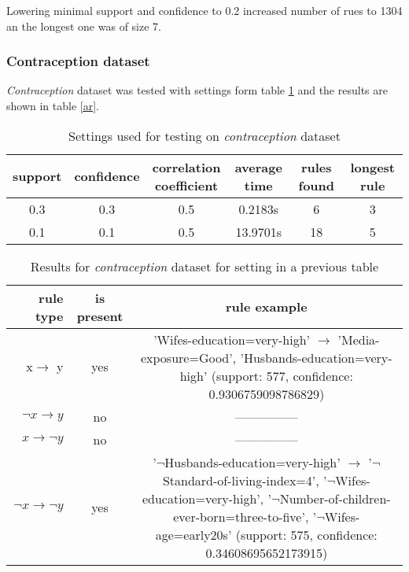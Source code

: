 \documentclass{article}
\begin{document}
	Lowering minimal support and confidence to 0.2 increased number of rues to 1304 an the longest one was of size 7.
 	
 	\subsubsection{Contraception dataset}
 	\textit{Contraception} dataset was tested with settings form table \ref{cs} and the results are shown in table \ref{ar}.
 	
 	\begin{table}[H]
 		\centering
 		\label{cs}
 		\begin{tabular}{c |c |c|c|c|c}
 			support&confidence&\makecell{correlation\\coefficient}&average time&rules found&longest rule\\
 			\hline
 			\hline
 			0.3&0.3&0.5&0.2183s&6&3\\
 			\hline
 			0.1&0.1&0.5&13.9701s&18&5\\
 		\end{tabular}
 		\caption{Settings used for testing on \textit{contraception} dataset}
 	\end{table}
 	\begin{table}[H]
 		\centering
 		\label{cr}
 		\begin{tabular}{r|c |c}
 			rule type& is present & rule example\\
 			\hline
 			\hline
 			x$\rightarrow$ y & yes & \makecell{'Wifes-education=very-high' $\rightarrow$\\'Media-exposure=Good', 'Husbands-education=very-high'\\ (support: 577, confidence: 0.9306759098786829)}\\
 			\hline
 			$\neg x\rightarrow y$ & no &---------------\\
 			\hline
 			$x\rightarrow \neg y $& no &---------------\\
 			\hline
 			$\neg x\rightarrow \neg y $& yes & \makecell{'$\neg$Husbands-education=very-high' $\rightarrow$\\ '$\neg$Standard-of-living-index=4', '$\neg$Wifes-education=very-high',\\ '$\neg$Number-of-children-ever-born=three-to-five',\\ '$\neg$Wifes-age=early20s'\\ (support: 575, confidence: 0.34608695652173915)}\\ 
 		\end{tabular}
 		\caption{Results for \textit{contraception} dataset for setting in a previous table}
 	\end{table}
 	
\end{document}
